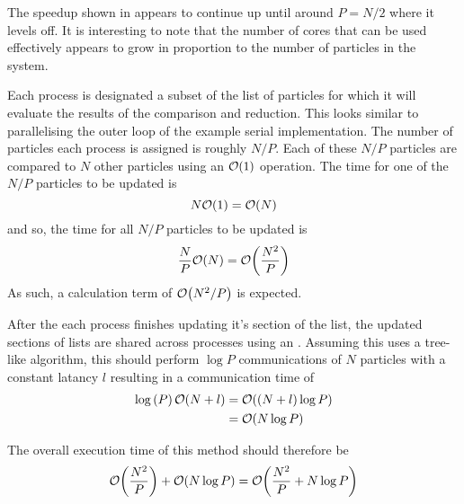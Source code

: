 The speedup shown in 
appears to continue up until around $P = N/2$ where it levels
off.
%
It is interesting to note that the number of cores that can be
used effectively appears to grow in proportion to the number of particles
in the system.

%
Each process is designated a subset of the list of particles for which
it will evaluate the results of the comparison and reduction.
%
This looks similar to parallelising the outer loop of the example
serial implementation.
%
The number of particles each process is assigned is roughly $N/P$.
%
Each of these $N/P$ particles are compared to $N$ other particles
using an $\mathcal{O}{\left({ 1 }\right)}$ operation.
%
The time for one of the $N/P$ particles to be updated is
\begin{equation}
    N\mathcal{O}{\left({ 1 }\right)} = \mathcal{O}{\left({ N }\right)}
\end  {equation}
and so, the time for all $N/P$ particles to be updated is
\begin{equation}
    \frac{N}{P}\mathcal{O}{\left({ N }\right)} = \mathcal{O}{\left({ \frac{N^2}{P} }\right)}
\end  {equation}
As such, a calculation term of $\mathcal{O}{\left({ N^2/P }\right)}$ is expected.

%
After the each process finishes updating it's section of the list,
the updated sections of lists are shared across processes using
an \mpiallgatherv{}.
Assuming this uses a tree-like algorithm, this should perform
$\log{P}$ communications of $N$ particles with a constant latancy $l$
resulting in a communication time of
\begin{equation}
    \begin{split}
        \log{(P)}\,\mathcal{O}{\left({ N + l }\right)}
            &= \mathcal{O}{\left({ (N+l)\log{P} }\right)} \\
            &= \mathcal{O}{\left({ N\log{P} }\right)}
    \end{split}
\end{equation}

%
The overall execution time of this method should therefore be
\begin{equation}
    \mathcal{O}{\left({ \frac{N^2}{P} }\right)} + \mathcal{O}{\left({ N\log{P} }\right)}
        = \mathcal{O}{\left({ \frac{N^2}{P} + N\log{P} }\right)}
        \label{eqn:v0_replicated_pair_operation_overall_time}
\end{equation}


